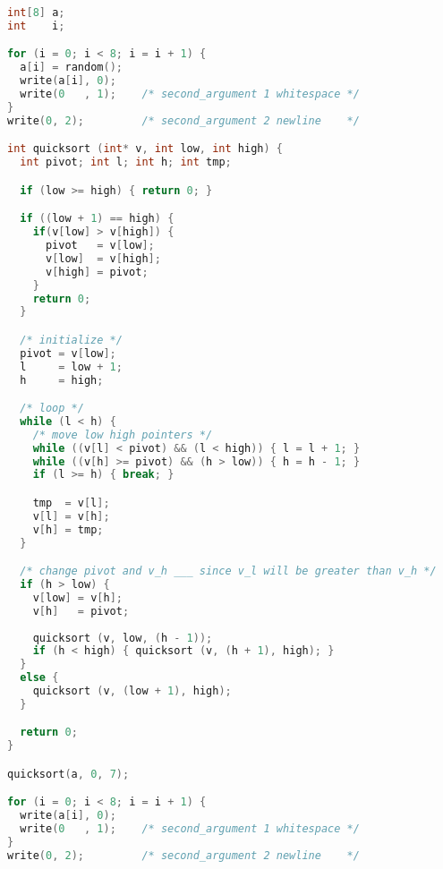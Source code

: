 \begin{lstlisting}[language=C, caption=Quicksort function example]
int[8] a;
int    i;

for (i = 0; i < 8; i = i + 1) {
  a[i] = random();
  write(a[i], 0);
  write(0   , 1);    /* second_argument 1 whitespace */
}
write(0, 2);         /* second_argument 2 newline    */

int quicksort (int* v, int low, int high) {
  int pivot; int l; int h; int tmp;

  if (low >= high) { return 0; }

  if ((low + 1) == high) {
    if(v[low] > v[high]) {
      pivot   = v[low];
      v[low]  = v[high];
      v[high] = pivot;
    }
    return 0;
  }

  /* initialize */
  pivot = v[low];
  l     = low + 1;
  h     = high;

  /* loop */
  while (l < h) {
    /* move low high pointers */
    while ((v[l] < pivot) && (l < high)) { l = l + 1; }
    while ((v[h] >= pivot) && (h > low)) { h = h - 1; }
    if (l >= h) { break; }

    tmp  = v[l];
    v[l] = v[h];
    v[h] = tmp;
  }

  /* change pivot and v_h ___ since v_l will be greater than v_h */
  if (h > low) {
    v[low] = v[h];
    v[h]   = pivot;
    
    quicksort (v, low, (h - 1));
    if (h < high) { quicksort (v, (h + 1), high); }
  }
  else {
    quicksort (v, (low + 1), high);
  }

  return 0;
}

quicksort(a, 0, 7);

for (i = 0; i < 8; i = i + 1) {
  write(a[i], 0);
  write(0   , 1);    /* second_argument 1 whitespace */
}
write(0, 2);         /* second_argument 2 newline    */
\end{lstlisting}



